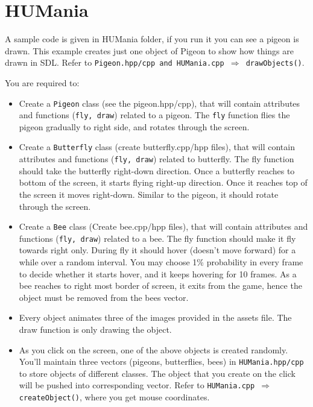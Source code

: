 \documentclass[a4paper,12pt]{article}
\begin{document}
	

	\section{HUMania}
	
	A sample code is given in HUMania folder, if you run it you can see a pigeon is drawn. This example creates just one object of Pigeon to show how things are drawn in SDL. Refer to \texttt{Pigeon.hpp/cpp and HUMania.cpp $ \Rightarrow $ drawObjects()}.
	
	 You are required to:
	 \begin{itemize}
	 	\item Create a \texttt{Pigeon} class (see the pigeon.hpp/cpp), that will contain attributes and functions (\texttt{fly, draw}) related to a pigeon. The \texttt{fly} function flies the pigeon gradually to right side, and rotates through the screen. 
	 	
	 	\item Create a \texttt{Butterfly} class (create butterfly.cpp/hpp files), that will contain attributes and functions (\texttt{fly, draw}) related to butterfly. The fly function should take the butterfly right-down direction. Once a butterfly reaches to bottom of the screen, it starts flying right-up direction. Once it reaches top of the screen it moves right-down. Similar to the pigeon, it should rotate through the screen. 
	 	
	 	\item Create a \texttt{Bee} class (Create bee.cpp/hpp files), that will contain attributes and functions (\texttt{fly, draw}) related to a bee. The fly function should make it fly towards right only. During fly it should hover (doesn't move forward) for a while over a random interval. You may choose 1\% probability in every frame to decide whether it starts hover, and it keeps hovering for 10 frames. As a bee reaches to right most border of screen, it exits from the game, hence the object must be removed from the bees vector.  
	 	
	 	\item Every object animates three of the images provided in the assets file. The draw function is only drawing the object.
	 	
	 	\item As you click on the screen, one of the above objects is created randomly. You'll maintain three vectors (pigeons, butterflies, bees) in \texttt{HUMania.hpp/cpp} to store objects of different classes. The object that you create on the click will be pushed into corresponding vector. Refer to \texttt{HUMania.cpp $ \Rightarrow $ createObject()}, where you get mouse coordinates.
	 	

\end{itemize}
\end{document}
